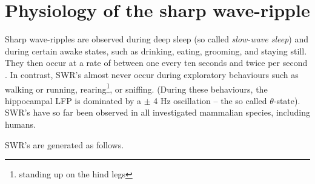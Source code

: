 \section{Physiology of the sharp wave-ripple}
\label{sec:physiology}

Sharp wave-ripples are observed during deep sleep (so called \emph{slow-wave sleep}) and during certain awake states, such as drinking, eating, grooming, and staying still. They then occur at a rate of between one every ten seconds and twice per second \cite{Girardeau2011}. In contrast, SWR's almost never occur during exploratory behaviours such as walking or running, rearing\footnote{standing up on the hind legs}, or sniffing. (During these behaviours, the hippocampal LFP is dominated by a $\pm$ 4 Hz oscillation -- the so called $\theta$-state). SWR's have so far been observed in all investigated mammalian species, including humans. \cite{Buzsaki2015}

SWR's are generated as follows. 
